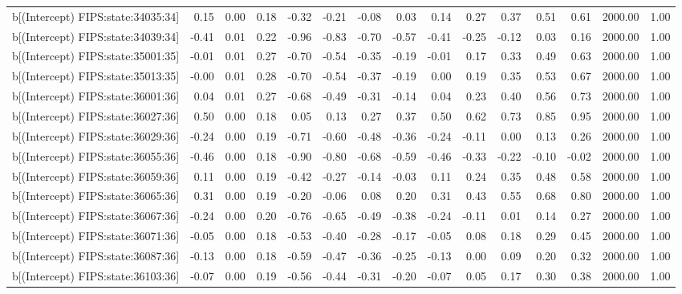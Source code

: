 \begin{table}[ht]
\begin{tabular}{rrrrrrrrrrrrrrr}
  b[(Intercept) FIPS:state:34035:34] & 0.15 & 0.00 & 0.18 & -0.32 & -0.21 & -0.08 & 0.03 & 0.14 & 0.27 & 0.37 & 0.51 & 0.61 & 2000.00 & 1.00 \\ 
  b[(Intercept) FIPS:state:34039:34] & -0.41 & 0.01 & 0.22 & -0.96 & -0.83 & -0.70 & -0.57 & -0.41 & -0.25 & -0.12 & 0.03 & 0.16 & 2000.00 & 1.00 \\ 
  b[(Intercept) FIPS:state:35001:35] & -0.01 & 0.01 & 0.27 & -0.70 & -0.54 & -0.35 & -0.19 & -0.01 & 0.17 & 0.33 & 0.49 & 0.63 & 2000.00 & 1.00 \\ 
  b[(Intercept) FIPS:state:35013:35] & -0.00 & 0.01 & 0.28 & -0.70 & -0.54 & -0.37 & -0.19 & 0.00 & 0.19 & 0.35 & 0.53 & 0.67 & 2000.00 & 1.00 \\ 
  b[(Intercept) FIPS:state:36001:36] & 0.04 & 0.01 & 0.27 & -0.68 & -0.49 & -0.31 & -0.14 & 0.04 & 0.23 & 0.40 & 0.56 & 0.73 & 2000.00 & 1.00 \\ 
  b[(Intercept) FIPS:state:36027:36] & 0.50 & 0.00 & 0.18 & 0.05 & 0.13 & 0.27 & 0.37 & 0.50 & 0.62 & 0.73 & 0.85 & 0.95 & 2000.00 & 1.00 \\ 
  b[(Intercept) FIPS:state:36029:36] & -0.24 & 0.00 & 0.19 & -0.71 & -0.60 & -0.48 & -0.36 & -0.24 & -0.11 & 0.00 & 0.13 & 0.26 & 2000.00 & 1.00 \\ 
  b[(Intercept) FIPS:state:36055:36] & -0.46 & 0.00 & 0.18 & -0.90 & -0.80 & -0.68 & -0.59 & -0.46 & -0.33 & -0.22 & -0.10 & -0.02 & 2000.00 & 1.00 \\ 
  b[(Intercept) FIPS:state:36059:36] & 0.11 & 0.00 & 0.19 & -0.42 & -0.27 & -0.14 & -0.03 & 0.11 & 0.24 & 0.35 & 0.48 & 0.58 & 2000.00 & 1.00 \\ 
  b[(Intercept) FIPS:state:36065:36] & 0.31 & 0.00 & 0.19 & -0.20 & -0.06 & 0.08 & 0.20 & 0.31 & 0.43 & 0.55 & 0.68 & 0.80 & 2000.00 & 1.00 \\ 
  b[(Intercept) FIPS:state:36067:36] & -0.24 & 0.00 & 0.20 & -0.76 & -0.65 & -0.49 & -0.38 & -0.24 & -0.11 & 0.01 & 0.14 & 0.27 & 2000.00 & 1.00 \\ 
  b[(Intercept) FIPS:state:36071:36] & -0.05 & 0.00 & 0.18 & -0.53 & -0.40 & -0.28 & -0.17 & -0.05 & 0.08 & 0.18 & 0.29 & 0.45 & 2000.00 & 1.00 \\ 
  b[(Intercept) FIPS:state:36087:36] & -0.13 & 0.00 & 0.18 & -0.59 & -0.47 & -0.36 & -0.25 & -0.13 & 0.00 & 0.09 & 0.20 & 0.32 & 2000.00 & 1.00 \\ 
  b[(Intercept) FIPS:state:36103:36] & -0.07 & 0.00 & 0.19 & -0.56 & -0.44 & -0.31 & -0.20 & -0.07 & 0.05 & 0.17 & 0.30 & 0.38 & 2000.00 & 1.00 \\ 

\end{tabular}
\end{table}
